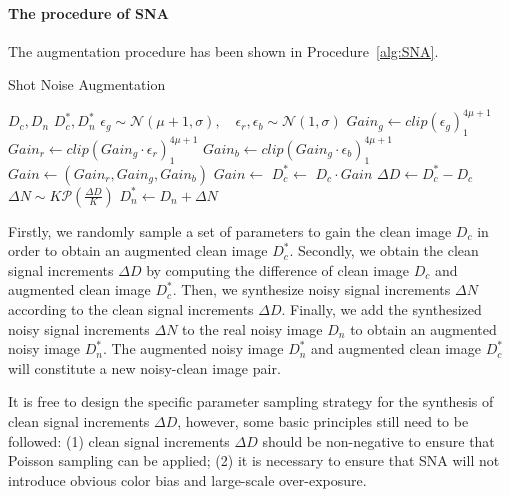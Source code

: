 \documentclass[sigconf,screen,nonacm]{acmart}
\begin{document}
    \paragraph{\textbf{The procedure of SNA}}
    The augmentation procedure has been shown in Procedure~\ref{alg:SNA}.
    \begin{algorithm}[t!]{}
    	\caption{Shot Noise Augmentation}
    	\label{alg:SNA}
\begin{algorithmic}
    		\Require $D_{c}, D_{n}$
    		\Ensure $D_{c}^*, D_{n}^*$
    		\State $\epsilon_{g} \sim \mathcal N(\mu+1, \sigma),\quad\epsilon_{r}, \epsilon_{b} \sim \mathcal N(1, \sigma)$
    		\State $Gain_{g} \gets clip(\epsilon_{g})_1^{4\mu+1}$
    		\State $Gain_{r} \gets clip(Gain_{g} \cdot \epsilon_{r})_1^{4\mu+1}$
    		\State $Gain_{b} \gets clip(Gain_{g} \cdot \epsilon_{b})_1^{4\mu+1}$
    		\State $Gain \gets (Gain_{r}, Gain_{g}, Gain_{b})$
    		\State {}
    		\EndFunction
    		\State $Gain \gets$ 
    		\State $D_{c}^* \gets$ $D_{c} \cdot Gain$
    		\State $\Delta D \gets D_{c}^* - D_{c}$
    		\State $\Delta N \sim K \mathcal P(\frac{\Delta D}{K})$
    		\State $D_{n}^* \gets D_{n} + \Delta N$
    	\end{algorithmic}
    \end{algorithm}
    
    Firstly, we randomly sample a set of parameters to gain the clean image $D_{c}$ in order to obtain an augmented clean image $D_{c}^*$. Secondly, we obtain the clean signal increments $\Delta D$ by computing the difference of clean image $D_{c}$ and augmented clean image $D_{c}^*$. Then, we synthesize noisy signal increments $\Delta N$ according to the clean signal increments $\Delta D$. Finally, we add the synthesized noisy signal increments $\Delta N$ to the real noisy image $D_{n}$ to obtain an augmented noisy image $D_{n}^*$. The augmented noisy image $D_{n}^*$ and augmented clean image $D_{c}^*$ will constitute a new noisy-clean image pair.

    It is free to design the specific parameter sampling strategy for the synthesis of clean signal increments $\Delta D$, however, some basic principles still need to be followed:
    (1) clean signal increments $\Delta D$ should be non-negative to ensure that Poisson sampling can be applied;
(2) it is necessary to ensure that SNA will not introduce obvious color bias and large-scale over-exposure.
    
\end{document}
